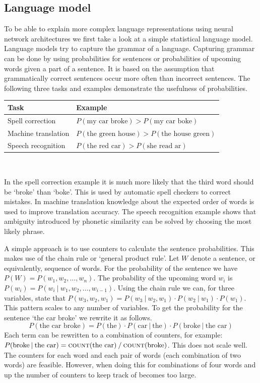 \subsection{Language model}
\label{subsec:language_model}
To be able to explain more complex language representations using neural network architectures we first take a look at a simple statistical language model.
Language models try to capture the grammar of a language.
Capturing grammar can be done by using probabilities for sentences or probabilities of upcoming words given a part of a sentence.
It is based on the assumption that grammatically correct sentences occur more often than incorrect sentences.
The following three tasks and examples demonstrate the usefulness of probabilities.
\begin{center}
    \begin{tabular}{l l}
        \textbf{Task} & \textbf{Example}\\
        \hline
        Spell correction & $P(\text{my car broke}) > P(\text{my car boke})$\\
        Machine translation & $P(\text{the green house}) > P(\text{the house green})$\\
        Speech recognition & $P(\text{the red car}) > P(\text{she read ar})$
    \end{tabular}\\
\end{center}
In the spell correction example it is much more likely that the third word should be `broke' than `boke'.
This is used by automatic spell checkers to correct mistakes.
In machine translation knowledge about the expected order of words is used to improve translation accuracy.
The speech recognition example shows that ambiguity introduced by phonetic similarity can be solved by choosing the most likely phrase.

A simple approach is to use counters to calculate the sentence probabilities.
This makes use of the chain rule or `general product rule'.
Let $W$ denote a sentence, or equivalently, sequence of words.
For the probability of the sentence we have $P(W) = P(w_1, w_2, \ldots, w_n)$.
The probability of the upcoming word $w_i$ is $P(w_i) = P(w_i \: | \: w_1, w_2, \ldots, w_{i-1})$.
Using the chain rule we can, for three variables, state that $P(w_3, w_2, w_1) = P(w_3 \: | \: w_2, w_1) \cdot P(w_2 \: | \: w_1) \cdot P(w_1)$.
This pattern scales to any number of variables.
To get the probability for the sentence `the car broke' we rewrite it as follows.
\[ P(\text{the car broke}) = P(\text{the}) \cdot P(\text{car} \: | \: \text{the}) \cdot P(\text{broke} \: | \: \text{the car}) \]
Each term can be rewritten to a combination of counters, for example: $P(\text{broke} \: | \: \text{the car}) = \textsc{count}(\text{the car}) \: / \: \textsc{count}(\text{broke})$.
This does not scale well.
The counters for each word and each pair of words (each combination of two words) are feasible.
However, when doing this for combinations of four words and up the number of counters to keep track of becomes too large.

